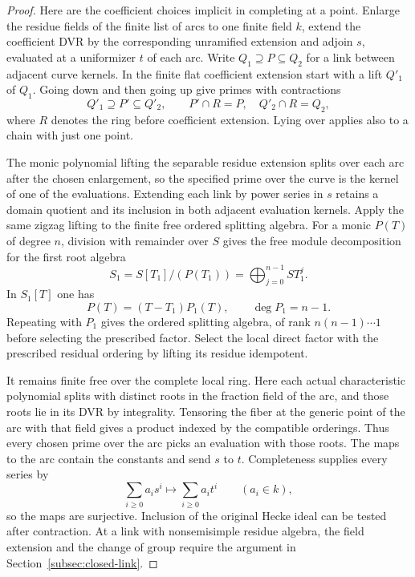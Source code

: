 \begin{proof}
Here are the coefficient choices implicit in completing at a point.
Enlarge the residue fields of the finite list of arcs to one finite field
\(k\), extend the coefficient DVR by the corresponding unramified extension
and adjoin \(s\), evaluated at a uniformizer \(t\) of each arc.
Write \(Q_1\supseteq P\subseteq Q_2\) for a link between adjacent curve kernels. In the finite flat coefficient extension start with a lift \(Q'_1\) of \(Q_1\). Going down and then going up give primes with contractions 
\[
 Q'_1\supseteq P'\subseteq Q'_2,\qquad P'\cap R=P,\quad Q'_2\cap R=Q_2,
\]
 where \(R\) denotes the ring before coefficient extension. Lying over applies also to a chain with just
one point.

The monic polynomial lifting the separable residue extension splits over each arc
after the chosen enlargement, so the specified prime over the curve is
the kernel of one of the evaluations. Extending each link by power series
in \(s\) retains a domain quotient and its inclusion in both adjacent
evaluation kernels. Apply the same zigzag lifting to the finite free
ordered splitting algebra. For a monic \(P(T)\) of degree \(n\), division with remainder over \(S\) gives the free module decomposition for the first root algebra
\[
 S_1=S[T_1]/(P(T_1))=\bigoplus_{j=0}^{n-1} ST_1^j .
\] In \(S_1[T]\) one has
\[
 P(T)=(T-T_1)P_1(T),\qquad \deg P_1=n-1 .
\]
Repeating with \(P_1\) gives the ordered splitting algebra, of rank \(n(n-1)\cdots1\) before selecting the prescribed factor. Select the local direct factor
with the prescribed residual ordering by lifting its residue
idempotent.

It remains finite free over the complete local ring.
Here each actual characteristic polynomial
splits with distinct roots in the fraction field of the arc, and those
roots lie in its DVR by integrality. Tensoring the fiber at the generic
point of the arc with that field gives a product indexed by the compatible orderings.
Thus every chosen prime over the arc picks an evaluation with those
roots. The maps to the arc contain the constants and send \(s\) to \(t\). Completeness supplies every series by
\[
 \sum_{i\ge0}a_i s^i\longmapsto \sum_{i\ge0}a_i t^i\qquad(a_i\in k),
\]
so the maps are surjective. Inclusion of the original Hecke ideal can be tested after
contraction. At a link with nonsemisimple residue algebra,
the field extension and the change of
group require the argument in Section~\ref{subsec:closed-link}.


\end{proof}
